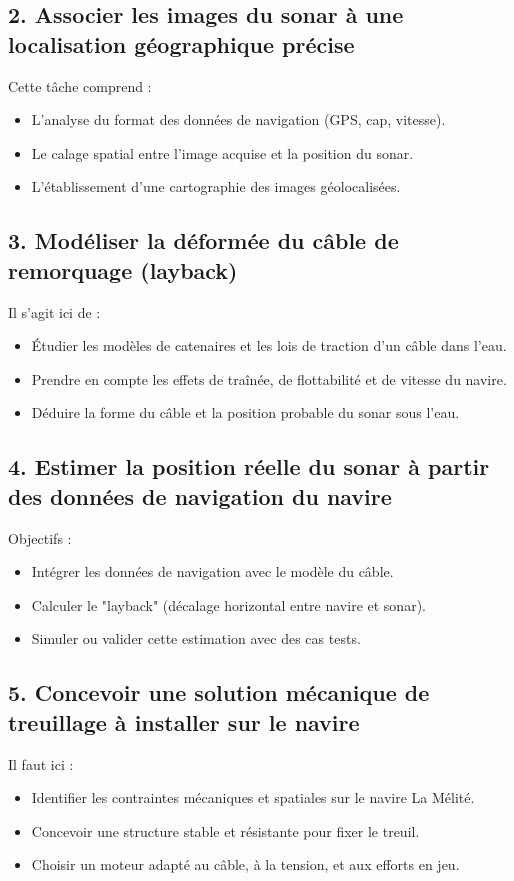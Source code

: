 \documentclass[a4paper,11pt]{article}
\begin{document}
\subsection*{2. Associer les images du sonar à une localisation géographique précise}
Cette tâche comprend :
\begin{itemize}
  \item L’analyse du format des données de navigation (GPS, cap, vitesse).
  \item Le calage spatial entre l’image acquise et la position du sonar.
  \item L’établissement d’une cartographie des images géolocalisées.
\end{itemize}

\subsection*{3. Modéliser la déformée du câble de remorquage (layback)}
Il s’agit ici de :
\begin{itemize}
  \item Étudier les modèles de catenaires et les lois de traction d’un câble dans l’eau.
  \item Prendre en compte les effets de traînée, de flottabilité et de vitesse du navire.
  \item Déduire la forme du câble et la position probable du sonar sous l’eau.
\end{itemize}

\subsection*{4. Estimer la position réelle du sonar à partir des données de navigation du navire}
Objectifs :
\begin{itemize}
  \item Intégrer les données de navigation avec le modèle du câble.
  \item Calculer le "layback" (décalage horizontal entre navire et sonar).
  \item Simuler ou valider cette estimation avec des cas tests.
\end{itemize}

\subsection*{5. Concevoir une solution mécanique de treuillage à installer sur le navire}
Il faut ici :
\begin{itemize}
  \item Identifier les contraintes mécaniques et spatiales sur le navire La Mélité.
  \item Concevoir une structure stable et résistante pour fixer le treuil.
  \item Choisir un moteur adapté au câble, à la tension, et aux efforts en jeu.
\end{itemize}
\end{document}
